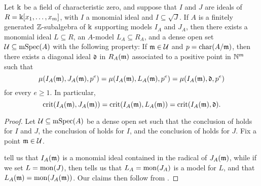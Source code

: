 \documentclass{amsart}
\begin{document}
\begin{corollary}
   \label{invariants associated to a monomial ideal in large characteristic: C}
   Let $\Bbbk$ be a field of characteristic zero, and suppose that $I$ and $J$ are ideals of  $R=\Bbbk[x_1, \ldots, x_m]$, with $I$ a monomial ideal and $I \subseteq \sqrt{J}$.
   If $A$ is a finitely generated $\mathbb{Z}$-subalgebra of $\Bbbk$ supporting models $I_A$ and $J_A$, then there exists a monomial ideal $L \subseteq R$, an $A$-model $L_A \subseteq R_A$, and a dense open set $\mathcal{U} \subseteq \operatorname{mSpec}(A)$ with the following property\textup:
   If $\mathfrak{m} \in \mathcal{U}$ and $p = \operatorname{char}(A/\mathfrak{m})$, then there exists a diagonal ideal $\mathfrak{d}$
   in $R_A(\mathfrak{m})$ associated to a positive point in $\mathbb{N}^m$ such that
   \[
      \mu(I_A(\mathfrak{m}), J_A(\mathfrak{m}), p^e) = \mu(I_A(\mathfrak{m}), L_A(\mathfrak{m}), p^e)  = \mu(I_A(\mathfrak{m}), \mathfrak{d}, p^e)
   \]
   for every $e \geq 1$.
   In particular,
   \[
      \operatorname{crit}(I_A(\mathfrak{m}), J_A(\mathfrak{m})) = \operatorname{crit}(I_A(\mathfrak{m}), L_A(\mathfrak{m}))= \operatorname{crit}(I_A(\mathfrak{m}), \mathfrak{d}).
   \]
\end{corollary}

\begin{proof}
   Let $\mathcal{U} \subseteq \operatorname{mSpec}(A)$ be a dense open set such that the conclusion of  holds for $I$ and $J$, the conclusion of  holds for $I$, and the conclusion of  holds for $J$.
   Fix a point $\mathfrak{m} \in \mathcal{U}$.

    tell us that $I_A(\mathfrak{m})$ is a monomial ideal contained in the radical of $J_A(\mathfrak{m})$, while if we set $L=\operatorname{mon}(J)$, then  tells us that $L_A = \operatorname{mon}(J_A)$ is a model for $L$, and that $L_A(\mathfrak{m}) = \operatorname{mon}(J_A(\mathfrak{m}))$.
   Our claims then follow from .
\end{proof}

{\small


}
\end{document}
